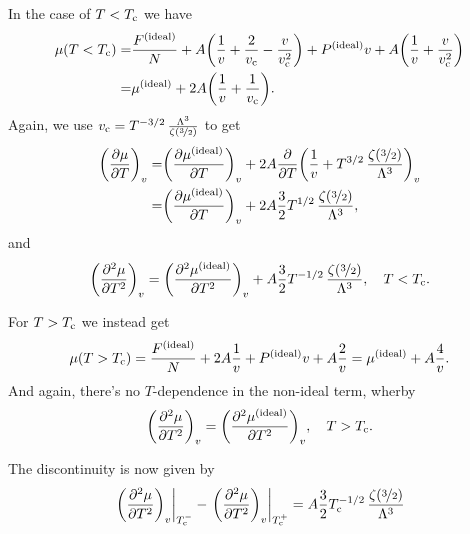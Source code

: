 \documentclass[11pt,letter, swedish, english
]{article}
\begin{document}
In the case of $T<T_{\text{c}}$ we have
\begin{equation}
\begin{aligned}
\mu(T<T_{\text{c}})=&\frac{F^\text{{(ideal)}}}{N}
+A\qty(\frac{1}{v}+\frac{2}{v_{\text{c}}}-\frac{v}{v_{\text{c}}^2})
+P^\text{{(ideal)}}v+A\qty(\frac{1}{v}+\frac{v}{v_{\text{c}}^2})\\
=&\mu^\text{{(ideal)}}
+2A\qty(\frac{1}{v}+\frac{1}{v_{\text{c}}}).
\end{aligned}
\end{equation}
Again, we use
$v_{\text{c}}=T^{-3/2}\,\frac{\Lambda^3}{\zeta(\nicefrac{3}{2})}$
to get
\begin{equation}
\begin{aligned}
\qty(\pdv{\mu}{T})_v=&\qty(\pdv{\mu^\text{{(ideal)}}}{T})_v
+2A\pdv{T}\qty(\frac{1}{v}+
T^{3/2}\,\frac{\zeta(\nicefrac{3}{2})}{\Lambda^3})_v\\
=&\qty(\pdv{\mu^\text{{(ideal)}}}{T})_v
+2A\frac{3}{2}
T^{1/2}\,\frac{\zeta(\nicefrac{3}{2})}{\Lambda^3},
\end{aligned}
\end{equation}
and
\begin{equation}
\qty(\pdv[2]{\mu}{T})_v
=\qty(\pdv[2]{\ideal{\mu}}{T})_v
+A\frac{3}{2}
T^{-1/2}\,\frac{\zeta(\nicefrac{3}{2})}{\Lambda^3}
\qcomma T<\Tc.
\end{equation}

For $T>T_{\text{c}}$ we instead get
\begin{equation}
\mu(T>T_{\text{c}})=\frac{F^\text{{(ideal)}}}{N}+2A\frac{1}{v}
+P^\text{{(ideal)}}v+A\frac{2}{v}
=\mu^\text{{(ideal)}}+A\frac{4}{v}.
\end{equation}
And again, there's no $T$-dependence in the non-ideal term, wherby 
\begin{equation}
\qty(\pdv[2]{\mu}{T})_v
=\qty(\pdv[2]{\ideal{\mu}}{T})_v
\qcomma T>\Tc.
\end{equation}

The discontinuity is now given by
\begin{equation}\label{eq:3_discont._mu}
\eval{\qty(\pdv[2]{\mu}{T})_v}_{\Tc^-}
-\eval{\qty(\pdv[2]{\mu}{T})_v}_{\Tc^+}
=A\frac{3}{2}
\Tc^{-1/2}\,\frac{\zeta(\nicefrac{3}{2})}{\Lambda^3}
\end{equation}
\end{document}
